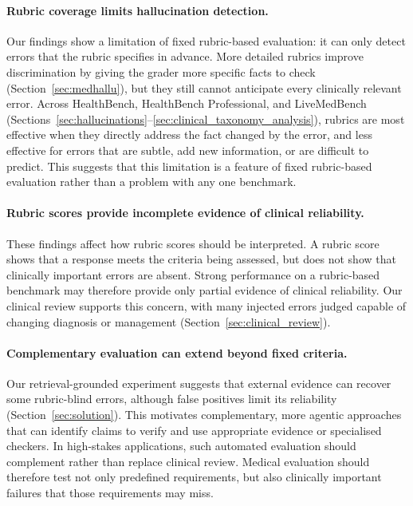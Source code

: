 \documentclass{article}
\begin{document}
\paragraph{\textbf{Rubric coverage limits hallucination detection.}}
Our findings show a limitation of fixed rubric-based evaluation: it can only detect errors that the rubric specifies in advance. More detailed rubrics improve discrimination by giving the grader more specific facts to check (Section~\ref{sec:medhallu}), but they still cannot anticipate every clinically relevant error. Across HealthBench, HealthBench Professional, and LiveMedBench (Sections~\ref{sec:hallucinations}--\ref{sec:clinical_taxonomy_analysis}), rubrics are most effective when they directly address the fact changed by the error, and less effective for errors that are subtle, add new information, or are difficult to predict. This suggests that this limitation is a feature of fixed rubric-based evaluation rather than a problem with any one benchmark.

\paragraph{\textbf{Rubric scores provide incomplete evidence of clinical reliability.}}
These findings affect how rubric scores should be interpreted. A rubric score shows that a response meets the criteria being assessed, but does not show that clinically important errors are absent. Strong performance on a rubric-based benchmark may therefore provide only partial evidence of clinical reliability. Our clinical review supports this concern, with many injected errors judged capable of changing diagnosis or management (Section~\ref{sec:clinical_review}).

\paragraph{\textbf{Complementary evaluation can extend beyond fixed criteria.}}

Our retrieval-grounded experiment suggests that external evidence can recover some rubric-blind errors, although false positives limit its reliability (Section~\ref{sec:solution}). This motivates complementary, more agentic approaches that can identify claims to verify and use appropriate evidence or specialised checkers. In high-stakes applications, such automated evaluation should complement rather than replace clinical review. Medical evaluation should therefore test not only predefined requirements, but also clinically important failures that those requirements may miss.
\end{document}
